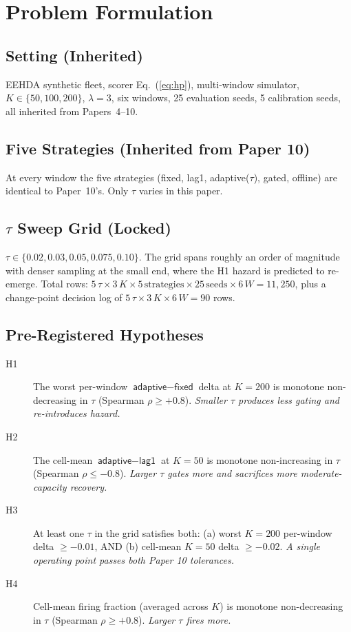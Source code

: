 \section{Problem Formulation}
\label{sec:problem}

\subsection{Setting (Inherited)}

EEHDA synthetic fleet, scorer Eq.~(\ref{eq:hp}), multi-window
simulator, $K \in \{50, 100, 200\}$, $\lambda = 3$, six windows,
25 evaluation seeds, 5 calibration seeds, all inherited from
Papers~4--10.

\subsection{Five Strategies (Inherited from Paper 10)}

At every window the five strategies (\textsf{fixed}, \textsf{lag1},
\textsf{adaptive}($\tau$), \textsf{gated}, \textsf{offline}) are
identical to Paper~10's. Only $\tau$ varies in this paper.

\subsection{$\tau$ Sweep Grid (Locked)}

$\tau \in \{0.02, 0.03, 0.05, 0.075, 0.10\}$. The grid spans roughly
an order of magnitude with denser sampling at the small end, where
the H1 hazard is predicted to re-emerge. Total rows:
$5\,\tau \times 3\,K \times 5\,\text{strategies} \times 25\,\text{seeds}
\times 6\,W = 11{,}250$, plus a change-point decision log of
$5\,\tau \times 3\,K \times 6\,W = 90$ rows.

\subsection{Pre-Registered Hypotheses}

\begin{description}
\item[H1] The worst per-window $\textsf{adaptive} - \textsf{fixed}$
delta at $K = 200$ is monotone non-decreasing in $\tau$
(Spearman $\rho \geq +0.8$). \textit{Smaller $\tau$ produces less
gating and re-introduces hazard.}
\item[H2] The cell-mean $\textsf{adaptive} - \textsf{lag1}$ at
$K = 50$ is monotone non-increasing in $\tau$
(Spearman $\rho \leq -0.8$). \textit{Larger $\tau$ gates more and
sacrifices more moderate-capacity recovery.}
\item[H3] At least one $\tau$ in the grid satisfies both:
(a) worst $K = 200$ per-window delta $\geq -0.01$, AND
(b) cell-mean $K = 50$ delta $\geq -0.02$. \textit{A single
operating point passes both Paper 10 tolerances.}
\item[H4] Cell-mean firing fraction (averaged across $K$) is monotone
non-decreasing in $\tau$ (Spearman $\rho \geq +0.8$). \textit{Larger
$\tau$ fires more.}
\end{description}
